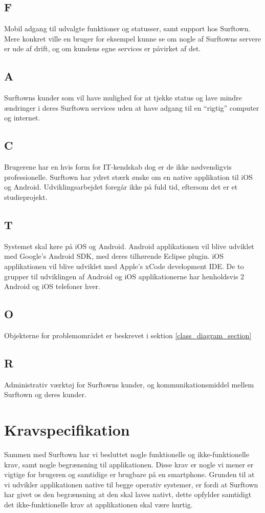 \documentclass[12pt]{article}
\begin{document}
\subsection*{F}
Mobil adgang til udvalgte funktioner og statusser, samt support hos Surftown. Mere konkret ville en bruger for eksempel kunne se om nogle af Surftowns servere er ude af drift, og om kundens egne services er påvirket af det.
\subsection*{A}
Surftowns kunder som vil have mulighed for at tjekke status og lave mindre ændringer i deres Surftown services uden at have adgang til en ``rigtig'' computer og internet.
\subsection*{C}
Brugerene har en hvis form for IT-kendskab dog er de ikke nødvendigvis professionelle. Surftown har ydret stærk ønske om en native applikation til iOS og Android. Udviklingsarbejdet foregår ikke på fuld tid, eftersom det er et studieprojekt.
\subsection*{T}
Systemet skal køre på iOS og Android. Android applikationen vil blive udviklet med Google's Android SDK, med deres tilhørende Eclipse plugin. iOS applikationen vil blive udviklet med Apple's xCode development IDE. De to grupper til udviklingen af Android og iOS applikationerne har henholdsvis 2 Android og iOS telefoner hver.
\subsection*{O}
Objekterne for problemområdet er beskrevet i sektion \ref{class_diagram_section}
\subsection*{R}
Administrativ værktøj for Surftowns kunder, og kommunikationsmiddel mellem Surftown og deres kunder.
\section{Kravspecifikation}
Sammen med Surftown har vi besluttet nogle funktionelle og ikke-funktionelle krav, samt nogle begrænsning til applikationen. Disse krav er nogle vi mener er vigtige for brugeren og samtidige er brugbare på en smartphone. Grunden til at vi udvikler applikationen native til begge operativ systemer, er fordi at Surftown har givet os den begrænsning at den skal laves nativt, dette  opfylder samtidigt det ikke-funktionelle krav at applikationen skal være hurtig.
\end{document}
